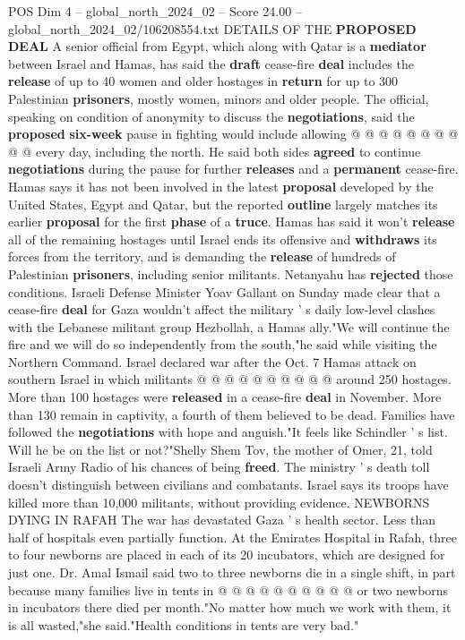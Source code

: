 \begin{textsample}{POS Dim 4 – global\_north\_2024\_02 – Score 24.00 – global\_north\_2024\_02/106208554.txt}
DETAILS OF THE \textbf{PROPOSED} \textbf{DEAL} A senior official from Egypt, which along with Qatar is a \textbf{mediator} between Israel and Hamas, has said the \textbf{draft} cease-fire \textbf{deal} includes the \textbf{release} of up to 40 women and older hostages in \textbf{return} for up to 300 Palestinian \textbf{prisoners}, mostly women, minors and older people.
The official, speaking on condition of anonymity to discuss the \textbf{negotiations}, said the \textbf{proposed} \textbf{six-week} pause in fighting would include allowing @ @ @ @ @ @ @ @ @ @ every day, including the north.
He said both sides \textbf{agreed} to continue \textbf{negotiations} during the pause for further \textbf{releases} and a \textbf{permanent} cease-fire.
Hamas says it has not been involved in the latest \textbf{proposal} developed by the United States, Egypt and Qatar, but the reported \textbf{outline} largely matches its earlier \textbf{proposal} for the first \textbf{phase} of a \textbf{truce}.
Hamas has said it won't \textbf{release} all of the remaining hostages until Israel ends its offensive and \textbf{withdraws} its forces from the territory, and is demanding the \textbf{release} of hundreds of Palestinian \textbf{prisoners}, including senior militants.
Netanyahu has \textbf{rejected} those conditions.
Israeli Defense Minister Yoav Gallant on Sunday made clear that a cease-fire \textbf{deal} for Gaza wouldn't affect the military ' s daily low-level clashes with the Lebanese militant group Hezbollah, a Hamas ally."We will continue the fire and we will do so independently from the south,"he said while visiting the Northern Command.
Israel declared war after the Oct. 7 Hamas attack on southern Israel in which militants @ @ @ @ @ @ @ @ @ @ around 250 hostages.
More than 100 hostages were \textbf{released} in a cease-fire \textbf{deal} in November.
More than 130 remain in captivity, a fourth of them believed to be dead.
Families have followed the \textbf{negotiations} with hope and anguish."It feels like Schindler ' s list.
Will he be on the list or not?"Shelly Shem Tov, the mother of Omer, 21, told Israeli Army Radio of his chances of being \textbf{freed}.
The ministry ' s death toll doesn't distinguish between civilians and combatants.
Israel says its troops have killed more than 10,000 militants, without providing evidence.
NEWBORNS DYING IN RAFAH The war has devastated Gaza ' s health sector.
Less than half of hospitals even partially function.
At the Emirates Hospital in Rafah, three to four newborns are placed in each of its 20 incubators, which are designed for just one.
Dr.
Amal Ismail said two to three newborns die in a single shift, in part because many families live in tents in @ @ @ @ @ @ @ @ @ @ or two newborns in incubators there died per month."No matter how much we work with them, it is all wasted,"she said."Health conditions in tents are very bad."

\end{textsample}
